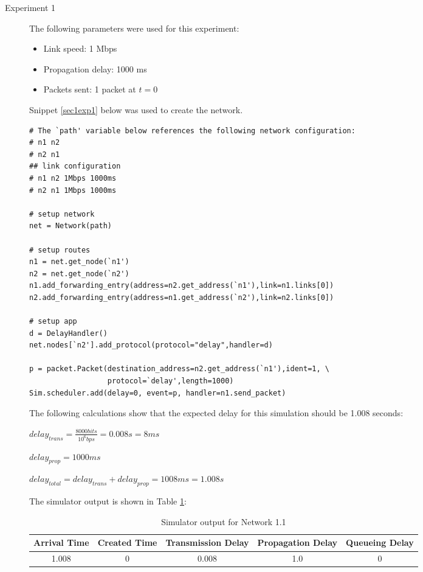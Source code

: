 \documentclass[11pt]{article}
\begin{document}
\begin{description}
\item[Experiment 1] \hfill \break
The following parameters were used for this experiment:

\begin{itemize}
\item Link speed: 1 Mbps
\item Propagation delay: 1000 ms
\item Packets sent: 1 packet at $t = 0$
\end{itemize}

\medskip

Snippet \ref{sec1exp1} below was used to create the network.

\medskip

\begin{lstlisting}[caption={Network 1.1},label=sec1exp1]
# The `path' variable below references the following network configuration:
# n1 n2
# n2 n1
## link configuration
# n1 n2 1Mbps 1000ms
# n2 n1 1Mbps 1000ms

# setup network
net = Network(path)

# setup routes
n1 = net.get_node(`n1')
n2 = net.get_node(`n2')
n1.add_forwarding_entry(address=n2.get_address(`n1'),link=n1.links[0])
n2.add_forwarding_entry(address=n1.get_address(`n2'),link=n2.links[0])

# setup app
d = DelayHandler()
net.nodes[`n2'].add_protocol(protocol="delay",handler=d)

p = packet.Packet(destination_address=n2.get_address(`n1'),ident=1, \
                  protocol=`delay',length=1000)
Sim.scheduler.add(delay=0, event=p, handler=n1.send_packet)
\end{lstlisting}

The following calculations show that the expected delay for this simulation should be 1.008 seconds:
\begin{addmargin}[1em]{0em}
$delay_{trans} = \frac{8000 bits}{10^{6}bps} = 0.008s = 8ms$

$delay_{prop} = 1000ms$

$delay_{total} = delay_{trans} + delay_{prop} = 1008ms = 1.008s$
\end{addmargin}

\bigskip

The simulator output is shown in Table \ref{tbl1.1}:

\smallskip

\begin{table}[H]
\begin{center}
\caption{Simulator output for Network 1.1}
\label{tbl1.1}
\begin{tabular}{ccccc}
  \toprule
  Arrival Time & Created Time & Transmission Delay & Propagation Delay & Queueing Delay\\
  \midrule
  1.008 & 0 & 0.008 & 1.0 & 0\\
  \bottomrule
\end{tabular}
\end{center}
\end{table}


\end{description}
\end{document}
